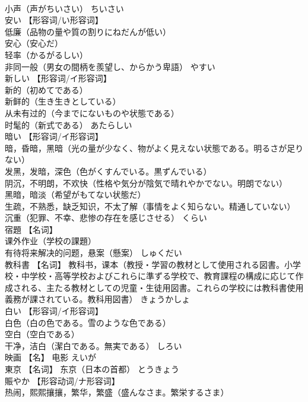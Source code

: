 \documentclass[8pt]{extreport}
\begin{document}
\begin{CJK}{UTF8}{min}
\\	小声（声がちいさい）	ちいさい	
\\	安い	【形容词/い形容词】 
\\	低廉（品物の量や質の割りにねだんが低い） 
\\	安心（安心だ） 
\\	轻率（かるがるしい） 
\\	非同一般（男女の間柄を羨望し、からかう卑語）	やすい	
\\	新しい	【形容词/イ形容词】 
\\	新的（初めてである） 
\\	新鲜的（生き生きとしている） 
\\	从未有过的（今までにないものや状態である） 
\\	时髦的（新式である）	あたらしい	
\\	暗い	【形容词/イ形容词】 
\\	暗，昏暗，黑暗（光の量が少なく、物がよく見えない状態である。明るさが足りない） 
\\	发黑，发暗，深色（色がくすんでいる。黒ずんでいる） 
\\	阴沉，不明朗，不欢快（性格や気分が陰気で晴れやかでない。明朗でない） 
\\	黑暗，暗淡（希望がもてない状態だ） 
\\	生疏，不熟悉，缺乏知识，不太了解（事情をよく知らない。精通していない） 
\\	沉重（犯罪、不幸、悲惨の存在を感じさせる）	くらい	
\\	宿題	【名词】 
\\	课外作业（学校の課題） 
\\	有待将来解决的问题，悬案（懸案）	しゅくだい	
\\	教科書	【名词】 教科书，课本（教授・学習の教材として使用される図書。小学校・中学校・高等学校およびこれらに準ずる学校で、教育課程の構成に応じて作成される、主たる教材としての児童・生徒用図書。これらの学校には教科書使用義務が課されている。教科用図書）	きょうかしょ	
\\	白い	【形容词/イ形容词】 
\\	白色（白の色である。雪のような色である） 
\\	空白（空白である） 
\\	干净，洁白（潔白である。無実である）	しろい	
\\	映画	【名】 电影	えいが	
\\	東京	【名词】 东京（日本の首都）	とうきょう	
\\	賑やか	【形容动词/ナ形容词】 
\\	热闹，熙熙攘攘，繁华，繁盛（盛んなさま。繁栄するさま） 

\end{CJK}
\end{document}
